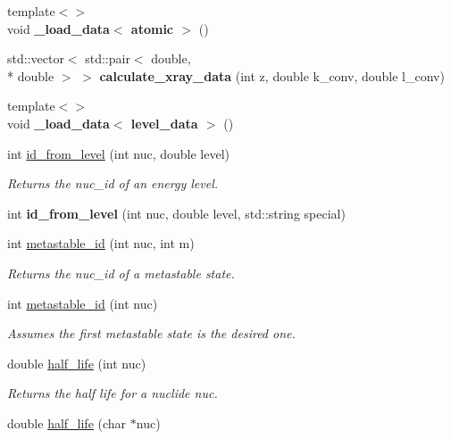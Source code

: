 \begin{DoxyCompactItemize}
\item 
\hypertarget{namespacepyne_a23231dd4e875d332e36d5cdc5cce1341}{{\footnotesize template$<$$>$ }\\void {\bfseries \-\_\-load\-\_\-data$<$ atomic $>$} ()}\label{namespacepyne_a23231dd4e875d332e36d5cdc5cce1341}

\item 
\hypertarget{namespacepyne_afc348e3a1127277ad3deacb309faddf1}{std\-::vector$<$ std\-::pair$<$ double, \\*
double $>$ $>$ {\bfseries calculate\-\_\-xray\-\_\-data} (int z, double k\-\_\-conv, double l\-\_\-conv)}\label{namespacepyne_afc348e3a1127277ad3deacb309faddf1}

\item 
\hypertarget{namespacepyne_ad12885416300033e2563dfe87e764f7c}{{\footnotesize template$<$$>$ }\\void {\bfseries \-\_\-load\-\_\-data$<$ level\-\_\-data $>$} ()}\label{namespacepyne_ad12885416300033e2563dfe87e764f7c}

\item 
int \hyperlink{namespacepyne_a11f4852ba4824c0e047b509efe0c6b8c}{id\-\_\-from\-\_\-level} (int nuc, double level)
\begin{DoxyCompactList}\small\item\em Returns the nuc\-\_\-id of an energy level. \end{DoxyCompactList}\item 
\hypertarget{namespacepyne_aa3d3232f957170f144e412fa170aaa58}{int {\bfseries id\-\_\-from\-\_\-level} (int nuc, double level, std\-::string special)}\label{namespacepyne_aa3d3232f957170f144e412fa170aaa58}

\item 
int \hyperlink{namespacepyne_a2e817a4d6dac740b6fa883ac99272201}{metastable\-\_\-id} (int nuc, int m)
\begin{DoxyCompactList}\small\item\em Returns the nuc\-\_\-id of a metastable state. \end{DoxyCompactList}\item 
\hypertarget{namespacepyne_ae4f71f8816cbdd47588d1c3c5fb4908c}{int \hyperlink{namespacepyne_ae4f71f8816cbdd47588d1c3c5fb4908c}{metastable\-\_\-id} (int nuc)}\label{namespacepyne_ae4f71f8816cbdd47588d1c3c5fb4908c}

\begin{DoxyCompactList}\small\item\em Assumes the first metastable state is the desired one. \end{DoxyCompactList}\item 
double \hyperlink{namespacepyne_a98f776164d1812878cb4b4ee4ef943f5}{half\-\_\-life} (int nuc)
\begin{DoxyCompactList}\small\item\em Returns the half life for a nuclide {\itshape nuc}. \end{DoxyCompactList}\item 
\hypertarget{namespacepyne_a120acb7c7ff96c26ff012aa192212160}{double \hyperlink{namespacepyne_a120acb7c7ff96c26ff012aa192212160}{half\-\_\-life} (char $\ast$nuc)}\label{namespacepyne_a120acb7c7ff96c26ff012aa192212160}


\end{DoxyCompactItemize}

